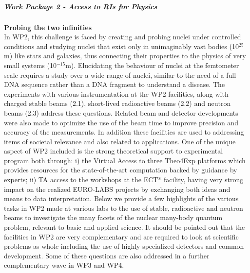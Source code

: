 %
% 












\subparagraph{Work Package 2 - Access to RIs for Physics} \mbox{}




\textbf{Probing the two infinities}\\
In WP2, this challenge is faced by creating and probing nuclei under controlled conditions and studying
nuclei that exist only in unimaginably vast bodies (10$^{25}$m) like stars and galaxies, thus connecting
their properties to the physics of very small systems (10$^{-15}$m).  Elucidating the behaviour of nuclei
at the femtometer scale requires a study over a wide range of nuclei, similar to the need of a full
DNA sequence rather than a DNA fragment to understand a disease. The experiments with various
instrumentation at the WP2 facilities, along with charged stable beams (2.1), short-lived radioactive
beams (2.2) and neutron beams (2.3) address these questions. Related beam and detector developments were also made to optimize  the use of the beam time to improve precision and accuracy of the measurements.  In addition these facilities are used to addressing items of  societal relevance and also related to applications. One of the unique aspect of WP2 included is the strong theoretical support to experimental program both through: i) the Virtual Access to three Theo4Exp platforms which provides resources for the state-of-the-art computation backed by guidance by experts; ii) TA access to the workshops at the ECT* facility, having very strong impact on the realized EURO-LABS projects by exchanging both ideas and means to data interpretation. Below we provide a few highlights of the various tasks in WP2 made at various labs to the use of stable, radioactive and neutron beams to investigate the many facets of the nuclear many-body quantum problem, relevant to basic and applied science. It should be pointed out that the facilities in WP2 are very complementary and are required to look at scientific problems as whole including the use of highly specialized detectors and common development. Some of these questions are also addressed in a further complementary wave in WP3 and WP4.


